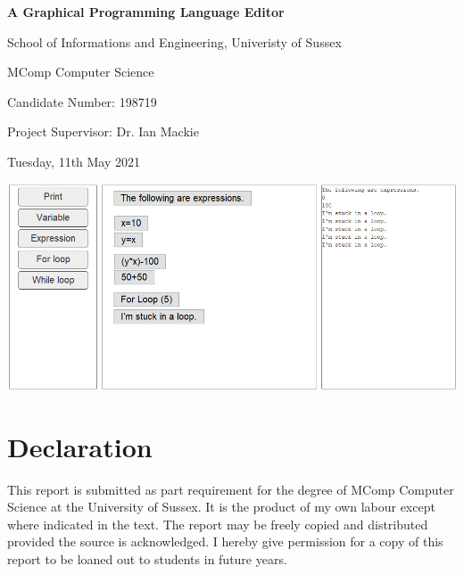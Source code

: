 \documentclass[a4paper, 12pt]{article}
\begin{document}
    \begin{titlepage}
        \begin{center}
            \vspace*{1cm}
            \Large
            \textbf{A Graphical Programming Language Editor}
            \vspace{0.5cm}

            School of Informations and Engineering, Univeristy of Sussex

            MComp Computer Science
            \vspace{1.5cm}

            Candidate Number: 198719

            Project Supervisor: Dr. Ian Mackie

            \vspace{0.5cm}
            Tuesday, 11th May 2021

            \vspace{1.5cm}
            \includegraphics[width=170mm]{showcase.png}
        \end{center}
    \end{titlepage}
    
    \clearpage
    \thispagestyle{empty}

    \clearpage
    \section*{Declaration}
        This report is submitted as part requirement for the degree of MComp Computer Science at
        the University of Sussex. It is the product of my own labour except where indicated in
        the text. The report may be freely copied and distributed provided the source is
        acknowledged. I hereby give permission for a copy of this report to be loaned out to
        students in future years. \\
\end{document}
